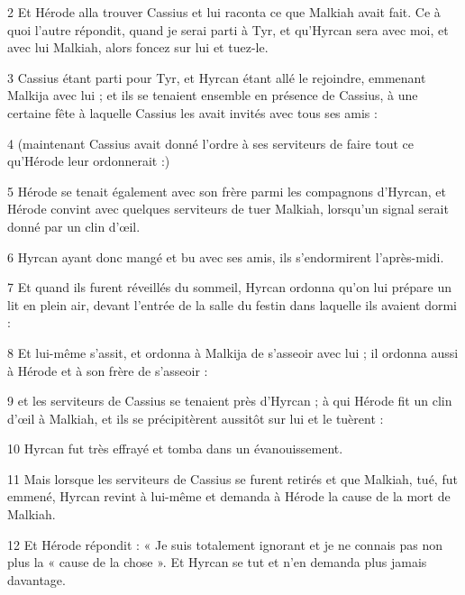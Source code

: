 \par 2 Et Hérode alla trouver Cassius et lui raconta ce que Malkiah avait fait. Ce à quoi l'autre répondit, quand je serai parti à Tyr, et qu'Hyrcan sera avec moi, et avec lui Malkiah, alors foncez sur lui et tuez-le.

\par 3 Cassius étant parti pour Tyr, et Hyrcan étant allé le rejoindre, emmenant Malkija avec lui ; et ils se tenaient ensemble en présence de Cassius, à une certaine fête à laquelle Cassius les avait invités avec tous ses amis :

\par 4 (maintenant Cassius avait donné l'ordre à ses serviteurs de faire tout ce qu'Hérode leur ordonnerait :)

\par 5 Hérode se tenait également avec son frère parmi les compagnons d'Hyrcan, et Hérode convint avec quelques serviteurs de tuer Malkiah, lorsqu'un signal serait donné par un clin d'œil.

\par 6 Hyrcan ayant donc mangé et bu avec ses amis, ils s'endormirent l'après-midi.

\par 7 Et quand ils furent réveillés du sommeil, Hyrcan ordonna qu'on lui prépare un lit en plein air, devant l'entrée de la salle du festin dans laquelle ils avaient dormi :

\par 8 Et lui-même s'assit, et ordonna à Malkija de s'asseoir avec lui ; il ordonna aussi à Hérode et à son frère de s'asseoir :

\par 9 et les serviteurs de Cassius se tenaient près d'Hyrcan ; à qui Hérode fit un clin d'œil à Malkiah, et ils se précipitèrent aussitôt sur lui et le tuèrent :

\par 10 Hyrcan fut très effrayé et tomba dans un évanouissement.

\par 11 Mais lorsque les serviteurs de Cassius se furent retirés et que Malkiah, tué, fut emmené, Hyrcan revint à lui-même et demanda à Hérode la cause de la mort de Malkiah.

\par 12 Et Hérode répondit : « Je suis totalement ignorant et je ne connais pas non plus la « cause de la chose ». Et Hyrcan se tut et n’en demanda plus jamais davantage.

